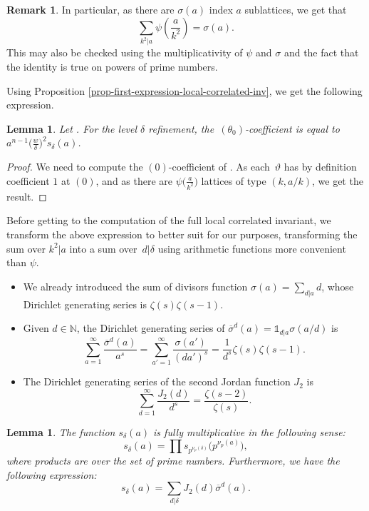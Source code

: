 \documentclass[pdftex]{sigma}
\newcommand{\NN}{\mathbb{N}}
\numberwithin{equation}{section}
\newtheorem{lem}[theo]{Lemma}
\theoremstyle{definition}
\newtheorem{remarkk}[theo]{Remark}
\begin{document}
\begin{remarkk}
In particular, as there are $\sigma(a)$ index $a$ sublattices, we get that
\[ \sum_{k^2|a}\psi\left(\frac{a}{k^2}\right)=\sigma(a). \]
This may also be checked using the multiplicativity of $\psi$ and $\sigma$ and the fact that the identity is true on powers of prime numbers.
\end{remarkk}

Using Proposition \ref{prop-first-expression-local-correlated-inv}, we get the following expression.

\begin{lem}
Let . For the level $\delta$ refinement, the~$(\theta_0)$-coefficient is equal to $a^{n-1}\bigl(\frac{w}{\delta}\bigr)^2s_\delta(a)$.
\end{lem}

\begin{proof}
We need to compute the $(0)$-coefficient of . As each~$\vartheta$ has by definition coefficient $1$ at $(0)$, and as there are $\psi\bigl(\frac{a}{k^2}\bigr)$ lattices of type $(k,a/k)$, we get the result.
\end{proof}

Before getting to the computation of the full local correlated invariant, we transform the above expression to better suit for our purposes, transforming the sum over $k^2|a$ into a sum over~$d|\delta$ using arithmetic functions more convenient than $\psi$.
\begin{itemize}\itemsep=0pt %
 \item We already introduced the sum of divisors function $\sigma(a)=\sum_{d|a}d$, whose Dirichlet generating series is $\zeta(s)\zeta(s-1)$.
 \item Given $d\in\NN$, the Dirichlet generating series of $\overline{\sigma}^d(a)=\mathds{1}_{d|a}\sigma(a/d)$ is
\[ \sum_{a=1}^\infty \frac{\overline{\sigma}^d(a)}{a^s} = \sum_{a'=1}^\infty \frac{\sigma(a')}{(da')^s}=\frac{1}{d^s}\zeta(s)\zeta(s-1). \]
 \item The Dirichlet generating series of the second Jordan function $J_2$ is
\[ \sum_{d=1}^\infty \frac{J_2(d)}{d^s}=\frac{\zeta(s-2)}{\zeta(s)}. \]
\end{itemize}

\begin{lem}
The function $s_\delta(a)$ is fully multiplicative in the following sense:
\[ s_\delta(a)=\prod s_{p^{\nu_p(\delta)}}\bigl(p^{\nu_p(a)}\bigr), \]
where products are over the set of prime numbers. Furthermore, we have the following expression:
\[ s_\delta(a)=\sum_{d|\delta} J_2(d)\overline{\sigma}^d(a). \]
\end{lem}
\end{document}
